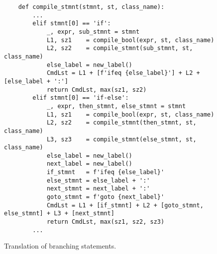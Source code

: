 \begin{figure}[!ht]
\centering
\begin{verbatim}
    def compile_stmnt(stmnt, st, class_name):
        ...
        elif stmnt[0] == 'if':
            _, expr, sub_stmnt = stmnt
            L1, sz1    = compile_bool(expr, st, class_name)
            L2, sz2    = compile_stmnt(sub_stmnt, st, class_name)
            else_label = new_label()
            CmdLst = L1 + [f'ifeq {else_label}'] + L2 + [else_label + ':']
            return CmdLst, max(sz1, sz2)
        elif stmnt[0] == 'if-else':
            _, expr, then_stmnt, else_stmnt = stmnt
            L1, sz1    = compile_bool(expr, st, class_name)
            L2, sz2    = compile_stmnt(then_stmnt, st, class_name)
            L3, sz3    = compile_stmnt(else_stmnt, st, class_name)        
            else_label = new_label()
            next_label = new_label()
            if_stmnt   = f'ifeq {else_label}'
            else_stmnt = else_label + ':'
            next_stmnt = next_label + ':'
            goto_stmnt = f'goto {next_label}'
            CmdLst = L1 + [if_stmnt] + L2 + [goto_stmnt, else_stmnt] + L3 + [next_stmnt]
            return CmdLst, max(sz1, sz2, sz3)
        ...       
\end{verbatim}
\vspace*{-0.3cm}
\caption{Translation of branching statements.}
\label{fig:Compiler.ipynb:compile:if}
\end{figure}

